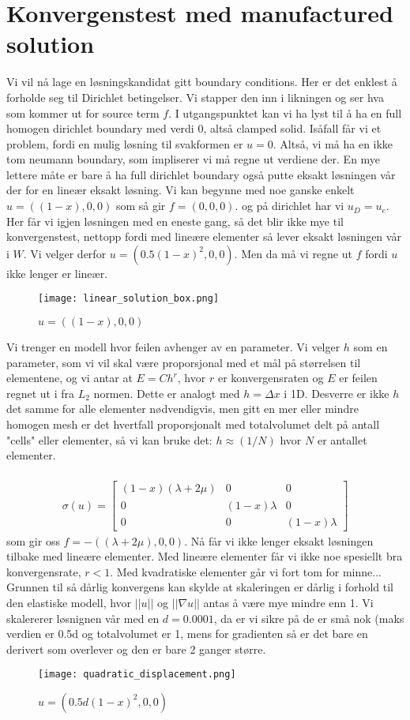 \documentclass[a4paper]{article}
\begin{document}
\section{Konvergenstest med manufactured solution}
Vi vil nå lage en løsningskandidat gitt boundary conditions. Her er det enklest å forholde seg til Dirichlet betingelser. Vi stapper den inn i likningen og ser hva som kommer ut for source term $f$. I utgangspunktet kan vi ha lyst til å ha en full homogen  dirichlet boundary med verdi $0$, altså clamped solid. Isåfall får vi et problem, fordi en mulig løsning til svakformen er $u=0$. Altså, vi må ha en ikke tom neumann boundary, som impliserer vi må regne ut verdiene der. En mye lettere måte er bare å ha full dirichlet boundary også putte eksakt løsningen vår der for en lineær eksakt løsning. Vi kan begynne med noe ganske enkelt $u=((1-x),0,0)$ som så gir $f=(0,0,0)$. og på dirichlet har vi $u_D = u_e$. Her får vi igjen løsningen med en eneste gang, så det blir ikke mye til konvergenstest, nettopp fordi med lineære elementer så lever eksakt løsningen vår i $W$. Vi velger derfor $u=(0.5(1-x)^2,0,0)$. Men da må vi regne ut $f$ fordi $u$ ikke lenger er lineær.
\begin{figure}[h]
\centering
\caption{$u=((1-x),0,0)$}
\texttt{[image: linear\_solution\_box.png]}
\end{figure}
Vi trenger en modell hvor feilen avhenger av en parameter. Vi velger $h$ som en parameter, som vi vil skal være proporsjonal med et mål på størrelsen til elementene, og vi antar at $E=Ch^r$, hvor $r$ er konvergensraten og $E$ er feilen regnet ut i fra $L_2$ normen. Dette er analogt med $h=\Delta x$ i 1D. Desverre er ikke $h$ det samme for alle elementer nødvendigvis, men gitt en mer eller mindre homogen mesh er det hvertfall proporsjonalt med totalvolumet delt på antall "cells" eller elementer, så vi kan bruke det: $h\approx (1/N)$ hvor $N$ er antallet elementer.
\\\\
\begin{align*}
\sigma(u) = 
\begin{bmatrix}
(1-x)(\lambda+2\mu) &  0 & 0\\
0 & (1-x)\lambda & 0\\
0 & 0 & (1-x)\lambda
\end{bmatrix}
\end{align*}
som gir oss $f=-((\lambda+2\mu),0,0)$. Nå får vi ikke lenger eksakt løsningen tilbake med lineære elementer. Med lineære elementer får vi ikke noe spesiellt bra konvergensrate, $r<1$. Med kvadratiske elementer går vi fort tom for minne... Grunnen til så dårlig konvergens kan skylde at skaleringen er dårlig i forhold til den elastiske modell, hvor $||u||$ og $||\nabla u||$ antas å være mye mindre enn 1. Vi skalererer løsnignen vår med en $d=0.0001$, da er vi sikre på de er små nok (maks verdien er 0.5d og totalvolumet er 1, mens for gradienten så er det bare en derivert som overlever og den er bare 2 ganger større.
\begin{figure}[h]
\centering
\caption{$u=(0.5d(1-x)^2,0,0)$}
\texttt{[image: quadratic\_displacement.png]}
\end{figure}
\end{document}
